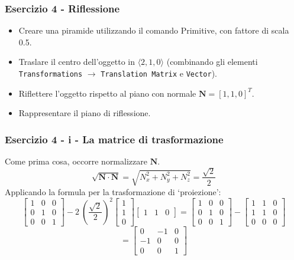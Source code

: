 \documentclass{beamer}
\begin{document}
\begin{frame}
\frametitle {Esercizio 4 - Riflessione}
\begin{itemize}
\item Creare una piramide utilizzando il comando Primitive, con fattore di scala 0.5.
\item Traslare il centro dell'oggetto in   $\langle 2,1,0\rangle$  (combinando gli elementi \texttt{Transformations} $\rightarrow$ \texttt{Translation Matrix} e \texttt{Vector}).  
\item Riflettere l'oggetto rispetto al piano con normale $\textbf{N}=[1,1,0]^T$.
\item Rappresentare il piano di riflessione.
\end{itemize}
\end{frame}
\begin{frame}
\frametitle {Esercizio 4 - i - La matrice di trasformazione}
Come prima cosa, occorre normalizzare $\textbf{N}$.
\begin{displaymath}
\sqrt{\mathbf{N} \cdot \mathbf{N}} =\sqrt{ N_x^2+N_y^2+N_z^2}=\frac{\sqrt{2}}{2}
\end{displaymath}
Applicando la formula per la trasformazione di `proiezione':
\begin{displaymath}
\begin{bmatrix}
1 & 0 & 0 \\
0 & 1 & 0 \\ 
0 & 0 & 1 
\end{bmatrix}
- 2~ \left(\frac{\sqrt{2}}{2}\right)^2
\begin{bmatrix}
1 \\
1 \\ 
0 
\end{bmatrix}
\begin{bmatrix}
1 & 1 &  0
\end{bmatrix}
= 
\begin{bmatrix}
1 & 0 & 0 \\
0 & 1 & 0 \\ 
0 & 0 & 1 
\end{bmatrix}
-
\begin{bmatrix}
1 & 1 & 0 \\
1 & 1 & 0 \\ 
0 & 0 & 0 
\end{bmatrix}
\end{displaymath}
{\color[rgb]{0.1,0,1}
\begin{displaymath}
=
\begin{bmatrix}
0  & -1 & 0 \\
-1 &  0 & 0 \\ 
0  &  0 & 1 
\end{bmatrix}
\end{displaymath}
}

\end{frame}
\end{document}
